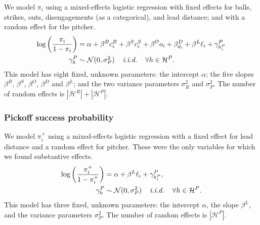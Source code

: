 \documentclass{article}
\begin{document}
        We model $\pi_i$ using a mixed-effects logistic regression with fixed effects for balls, strikes, outs, disengagements (as a categorical), and lead distance; and with a random effect for the pitcher.
        \begin{align}
          \label{eqn:prob-po-attempt}
          \begin{split}
            \log\left(\frac{\pi_i}{1 - \pi_i}\right) &= \alpha + \beta^B c_i^B + \beta^S c_i^S + \beta^O o_i + \beta^D_{d_i} + \beta^L \ell_i + \gamma^P_{h_i^P}\\
            \gamma^P_{h} &\sim \mathcal{N}(0, \sigma^2_P) \hspace{4mm} \mbox{\it i.i.d.} \hspace{4mm} \forall h \in \mathcal{H}^P.
          \end{split}
        \end{align}
        This model has eight fixed, unknown parameters: the intercept $\alpha$; the five slopes $\beta^B$, $\beta^S$, $\beta^O$, $\beta^D$ and $\beta^L$; and the two variance parameters $\sigma^2_R$ and $\sigma^2_P$. The number of random effects is $|\mathcal{H}^R| + |\mathcal{H}^P|$.
        
      \subsubsection{Pickoff success probability}
      \label{sec:prob-po-success}

        We model $\pi_i^+$ using a mixed-effects logistic regression with a fixed effect for lead distance and a random effect for pitcher. These were the only variables for which we found substantive effects.
        \begin{align}
          \label{eqn:prob-po-success}
          \begin{split}
            \log\left(\frac{\pi_i^+}{1 - \pi_i^+}\right) &= \alpha + \beta^L \ell_i + \gamma^P_{h_i^P},\\
            \gamma^P_{h} &\sim \mathcal{N}(0, \sigma^2_P) \hspace{4mm} \mbox{\it i.i.d.} \hspace{4mm} \forall h \in \mathcal{H}^P.
          \end{split}
        \end{align}
        This model has three fixed, unknown parameters: the intercept $\alpha$, the slope $\beta^L$, and the variance parameters $\sigma^2_P$. The number of random effects is $|\mathcal{H}^P|$.
\end{document}
